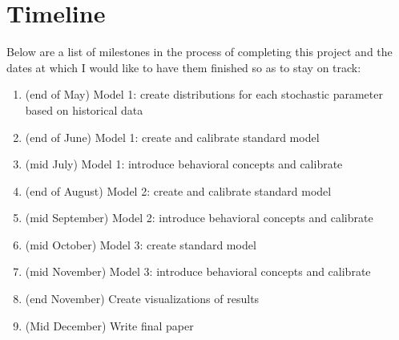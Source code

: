 \documentclass[10pt,twocolumn]{article}
\begin{document}
\section{Timeline}
Below are a list of milestones in the process of completing this project and the dates at which I would like to have them finished so as to stay on track:
\begin{enumerate}
    \item (end of May) Model 1: create distributions for each stochastic parameter based on historical data
    \item (end of June) Model 1: create and calibrate standard model
    \item (mid July) Model 1: introduce behavioral concepts and calibrate
    \item (end of August) Model 2: create and calibrate standard model
    \item (mid September) Model 2: introduce behavioral concepts and calibrate
    \item (mid October) Model 3: create standard model
    \item (mid November) Model 3: introduce behavioral concepts and calibrate
    \item (end November) Create visualizations of results
    \item (Mid December) Write final paper
\end{enumerate}

\printbibliography
\end{document}
